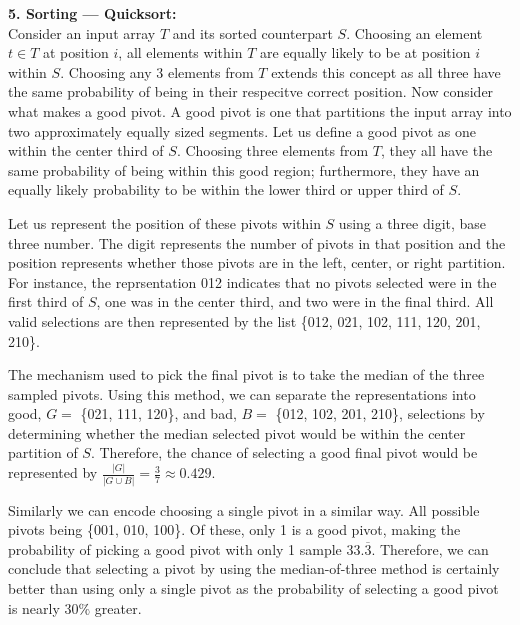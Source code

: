 \documentclass[12pt]{article}
\begin{document}
\textbf{5. Sorting --- Quicksort:} \\

Consider an input array $T$ and its sorted counterpart $S$. Choosing an element $t \in T$ at position $i$, all elements within $T$ are equally likely to be at position $i$ within $S$. Choosing any 3 elements from $T$ extends this concept as all three have the same probability of being in their respecitve correct position. Now consider what makes a good pivot. A good pivot is one that partitions the input array into two approximately equally sized segments. Let us define a good pivot as one within the center third of $S$. Choosing three elements from $T$, they all have the same probability of being within this good region; furthermore, they have an equally likely probability to be within the lower third or upper third of $S$.

Let us represent the position of these pivots within $S$ using a three digit, base three number. The digit represents the number of pivots in that position and the position represents whether those pivots are in the left, center, or right partition. For instance, the reprsentation 012 indicates that no pivots selected were in the first third of $S$, one was in the center third, and two were in the final third. All valid selections are then represented by the list \{012, 021, 102, 111, 120, 201, 210\}.

The mechanism used to pick the final pivot is to take the median of the three sampled pivots. Using this method, we can separate the representations into good, $G = $ \{021, 111, 120\}, and bad, $B = $ \{012, 102, 201, 210\}, selections by determining whether the median selected pivot would be within the center partition of $S$. Therefore, the chance of selecting a good final pivot would be represented by $\frac{|G|}{|G \cup B|} = \frac{3}{7} \approx 0.429$.

Similarly we can encode choosing a single pivot in a similar way. All possible pivots being \{001, 010, 100\}. Of these, only 1 is a good pivot, making the probability of picking a good pivot with only 1 sample $33.\overline{3}$. Therefore, we can conclude that selecting a pivot by using the median-of-three method is certainly better than using only a single pivot as the probability of selecting a good pivot is nearly $30\%$ greater.
\end{document}
